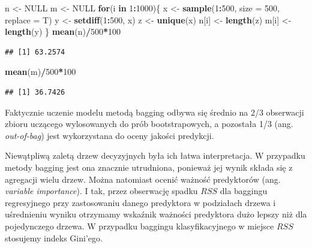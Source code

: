 \documentclass[]{book}
\newenvironment{Shaded}{\begin{snugshade}}{\end{snugshade}}
\newcommand{\ControlFlowTok}[1]{\textcolor[rgb]{0.13,0.29,0.53}{\textbf{#1}}}
\newcommand{\DataTypeTok}[1]{\textcolor[rgb]{0.13,0.29,0.53}{#1}}
\newcommand{\DecValTok}[1]{\textcolor[rgb]{0.00,0.00,0.81}{#1}}
\newcommand{\KeywordTok}[1]{\textcolor[rgb]{0.13,0.29,0.53}{\textbf{#1}}}
\newcommand{\NormalTok}[1]{#1}
\newcommand{\OperatorTok}[1]{\textcolor[rgb]{0.81,0.36,0.00}{\textbf{#1}}}
\newcommand{\OtherTok}[1]{\textcolor[rgb]{0.56,0.35,0.01}{#1}}
\newcommand{\StringTok}[1]{\textcolor[rgb]{0.31,0.60,0.02}{#1}}
\theoremstyle{plain}
\theoremstyle{definition}
\begin{document}
\begin{Shaded}
\begin{Highlighting}[]
\NormalTok{n <-}\StringTok{ }\OtherTok{NULL}
\NormalTok{m <-}\StringTok{ }\OtherTok{NULL}
\ControlFlowTok{for}\NormalTok{(i }\ControlFlowTok{in} \DecValTok{1}\OperatorTok{:}\DecValTok{1000}\NormalTok{)\{}
\NormalTok{    x <-}\StringTok{ }\KeywordTok{sample}\NormalTok{(}\DecValTok{1}\OperatorTok{:}\DecValTok{500}\NormalTok{, }\DataTypeTok{size =} \DecValTok{500}\NormalTok{, }\DataTypeTok{replace =}\NormalTok{ T)}
\NormalTok{    y <-}\StringTok{ }\KeywordTok{setdiff}\NormalTok{(}\DecValTok{1}\OperatorTok{:}\DecValTok{500}\NormalTok{, x)}
\NormalTok{    z <-}\StringTok{ }\KeywordTok{unique}\NormalTok{(x)}
\NormalTok{    n[i] <-}\StringTok{ }\KeywordTok{length}\NormalTok{(z)}
\NormalTok{    m[i] <-}\StringTok{ }\KeywordTok{length}\NormalTok{(y)}
\NormalTok{\}}
\KeywordTok{mean}\NormalTok{(n)}\OperatorTok{/}\DecValTok{500}\OperatorTok{*}\DecValTok{100}
\end{Highlighting}
\end{Shaded}

\begin{verbatim}
## [1] 63.2574
\end{verbatim}

\begin{Shaded}
\begin{Highlighting}[]
\KeywordTok{mean}\NormalTok{(m)}\OperatorTok{/}\DecValTok{500}\OperatorTok{*}\DecValTok{100}
\end{Highlighting}
\end{Shaded}

\begin{verbatim}
## [1] 36.7426
\end{verbatim}

Faktycznie uczenie modelu metodą bagging odbywa się średnio na 2/3 obserwacji zbioru uczącego wylosowanych do prób bootstrapowych, a pozostała 1/3 (ang. \emph{out-of-bag}) jest wykorzystana do oceny jakości predykcji.

Niewątpliwą zaletą drzew decyzyjnych była ich łatwa interpretacja. W przypadku metody bagging jest ona znacznie utrudniona, ponieważ jej wynik składa się z agregacji wielu drzew. Można natomiast ocenić ważność predyktorów (ang. \emph{variable importance}). I tak, przez obserwację spadku \(RSS\) dla baggingu regresyjnego przy zastosowaniu danego predyktora w podziałach drzewa i uśrednieniu wyniku otrzymamy wskaźnik ważności predyktora dużo lepszy niż dla pojedynczego drzewa. W przypadku baggingu klasyfikacyjnego w miejsce \(RSS\) stosujemy indeks Gini'ego.
\end{document}
